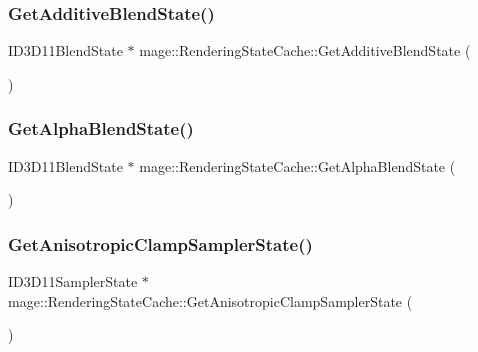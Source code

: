 \subsubsection{\texorpdfstring{Get\+Additive\+Blend\+State()}{GetAdditiveBlendState()}}
{\footnotesize\ttfamily I\+D3\+D11\+Blend\+State $\ast$ mage\+::\+Rendering\+State\+Cache\+::\+Get\+Additive\+Blend\+State (\begin{DoxyParamCaption}{ }\end{DoxyParamCaption})}

\hypertarget{structmage_1_1_rendering_state_cache_a19ad72ad35096722e3d61e58e0ab9205}{}\label{structmage_1_1_rendering_state_cache_a19ad72ad35096722e3d61e58e0ab9205} 
\subsubsection{\texorpdfstring{Get\+Alpha\+Blend\+State()}{GetAlphaBlendState()}}
{\footnotesize\ttfamily I\+D3\+D11\+Blend\+State $\ast$ mage\+::\+Rendering\+State\+Cache\+::\+Get\+Alpha\+Blend\+State (\begin{DoxyParamCaption}{ }\end{DoxyParamCaption})}

\hypertarget{structmage_1_1_rendering_state_cache_ad4b0894beba4725e53a5a7ca3b9085cb}{}\label{structmage_1_1_rendering_state_cache_ad4b0894beba4725e53a5a7ca3b9085cb} 
\subsubsection{\texorpdfstring{Get\+Anisotropic\+Clamp\+Sampler\+State()}{GetAnisotropicClampSamplerState()}}
{\footnotesize\ttfamily I\+D3\+D11\+Sampler\+State $\ast$ mage\+::\+Rendering\+State\+Cache\+::\+Get\+Anisotropic\+Clamp\+Sampler\+State (\begin{DoxyParamCaption}{ }\end{DoxyParamCaption})}

\hypertarget{structmage_1_1_rendering_state_cache_a183a1b919105bd1758cc6fb6cdeab018}{}\label{structmage_1_1_rendering_state_cache_a183a1b919105bd1758cc6fb6cdeab018} 

